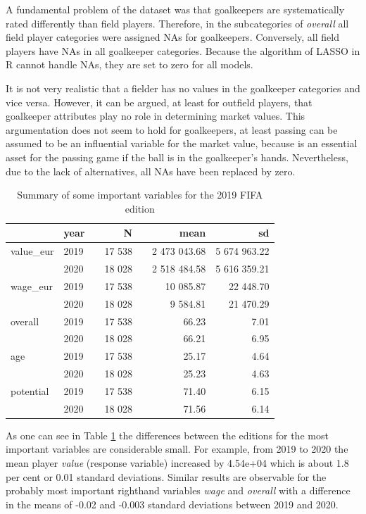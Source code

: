 \documentclass[12pt,a4paper]{article}
\begin{document}
A fundamental problem of the dataset was that goalkeepers are
systematically rated differently than field players. Therefore, in the
subcategories of \emph{overall} all field player categories were
assigned NAs for goalkeepers. Conversely, all field players have NAs in
all goalkeeper categories. Because the algorithm of \ac{LASSO} in R
cannot handle NAs, they are set to zero for all models.

It is not very realistic that a fielder has no values in the goalkeeper
categories and vice versa. However, it can be argued, at least for
outfield players, that goalkeeper attributes play no role in determining
market values. This argumentation does not seem to hold for goalkeepers,
at least passing can be assumed to be an influential variable for the
market value, because is an essential asset for the passing game if the
ball is in the goalkeeper's hands. Nevertheless, due to the lack of
alternatives, all NAs have been replaced by zero.

\begin{table}[!h]

\caption{\label{tab:unnamed-chunk-3}\label{tab:sum} Summary of some important variables for the 2019 FIFA edition}
\centering
\begin{tabular}[t]{lllrlrr}
\toprule
 & year &  & N &   & mean & sd\\
\midrule
\rowcolor{gray!6}  value\_eur & 2019 &  & 17 538 &  & 2 473 043.68 & 5 674 963.22\\
 & 2020 &  & 18 028 &  & 2 518 484.58 & 5 616 359.21\\
\rowcolor{gray!6}  wage\_eur & 2019 &  & 17 538 &  & 10 085.87 & 22 448.70\\
 & 2020 &  & 18 028 &  & 9 584.81 & 21 470.29\\
\rowcolor{gray!6}  overall & 2019 &  & 17 538 &  & 66.23 & 7.01\\
 & 2020 &  & 18 028 &  & 66.21 & 6.95\\
\rowcolor{gray!6}  age & 2019 &  & 17 538 &  & 25.17 & 4.64\\
 & 2020 &  & 18 028 &  & 25.23 & 4.63\\
\rowcolor{gray!6}  potential & 2019 &  & 17 538 &  & 71.40 & 6.15\\
 & 2020 &  & 18 028 &  & 71.56 & 6.14\\
\bottomrule
\end{tabular}
\end{table}

As one can see in Table \ref{tab:sum} the differences between the
editions for the most important variables are considerable small. For
example, from 2019 to 2020 the mean player \emph{value} (response
variable) increased by 4.54e+04 which is about 1.8 per cent or 0.01
standard deviations. Similar results are observable for the probably
most important righthand variables \emph{wage} and \emph{overall} with a
difference in the means of -0.02 and -0.003 standard deviations between
2019 and 2020.
\end{document}
